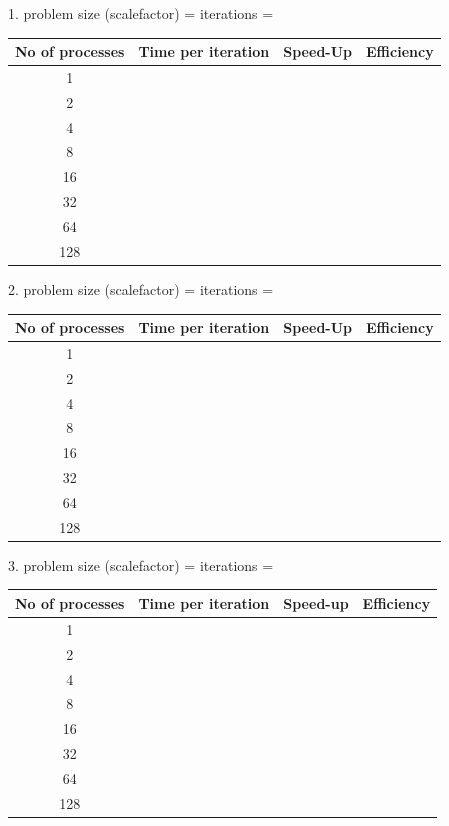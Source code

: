 \documentclass{article}
\begin{document}
\newpage

1. problem size (scalefactor) = \underline{\hspace{3cm}} iterations =\underline{\hspace{3cm}}

\begin{center}
\begin{tabular}{|c||c|c|c|}
\hline
No of processes & Time per iteration & Speed-Up & Efficiency \\
\hline
\hline
1 & & & \\
\hline
2 & & & \\
\hline
4 & & & \\
\hline
8 & & & \\
\hline
16 & & & \\
\hline
32 & & & \\
\hline
64 & & & \\
\hline
128 & & & \\
\hline
\end{tabular}
\end{center}

2. problem size (scalefactor) = \underline{\hspace{3cm}} iterations =\underline{\hspace{3cm}}

\begin{center}
\begin{tabular}{|c||c|c|c|}
\hline
No of processes & Time per iteration & Speed-Up & Efficiency \\
\hline
\hline
1 & & & \\
\hline
2 & & & \\
\hline
4 & & & \\
\hline
8 & & & \\
\hline
16 & & & \\
\hline
32 & & & \\
\hline
64 & & & \\
\hline
128 & & & \\
\hline
\end{tabular}
\end{center}

3. problem size (scalefactor) = \underline{\hspace{3cm}} iterations =\underline{\hspace{3cm}}

\begin{center}
\begin{tabular}{|c||c|c|c|}
\hline
No of processes & Time per iteration & Speed-up & Efficiency \\
\hline
\hline
1 & & & \\
\hline
2 & & & \\
\hline
4 & & & \\
\hline
8 & & & \\
\hline
16 & & & \\
\hline
32 & & & \\
\hline
64 & & & \\
\hline
128 & & & \\
\hline
\end{tabular}
\end{center}
\end{document}
